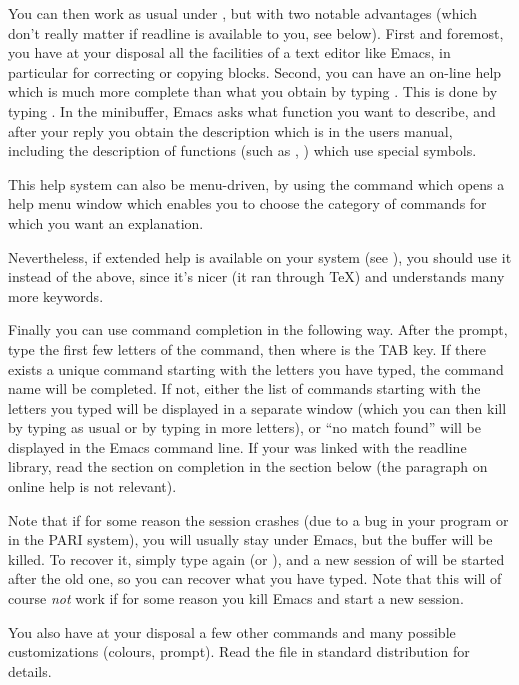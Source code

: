 \smallskip
  You can then work as usual under , but with two notable advantages (which
don't really matter if readline is available to you, see below). First and
foremost, you have at your disposal all the facilities of a text editor like
Emacs, in particular for correcting or copying blocks. Second, you can have
an on-line help which is much more complete than what you obtain by typing
. This is done by typing . In the minibuffer, Emacs asks
what function you want to describe, and after your reply you obtain the
description which is in the users manual, including the description of
functions (such as \kbd{\bs}, \kbd{\%}) which use special symbols.

  This help system can also be menu-driven, by using the command
 which opens a help menu window which enables you to choose
the category of commands for which you want an explanation.

  Nevertheless, if extended help is available on your system (see
), you should use it instead of the above, since it's
nicer (it ran through \TeX) and understands many more keywords.

  Finally you can use command completion in the following way. After the
prompt, type the first few letters of the command, then  where
 is the TAB key. If there exists a unique command starting with
the letters you have typed, the command name will be completed. If not,
either the list of commands starting with the letters you typed will be
displayed in a separate window (which you can then kill by typing as usual
 or by typing in more letters), or ``no match found'' will be
displayed in the Emacs command line. If your  was linked with the readline
library, read the section on completion in the section below (the paragraph
on online help is not relevant).

Note that if for some reason the session crashes (due to a bug in your
program or in the PARI system), you will usually stay under Emacs, but the
 buffer will be killed. To recover it, simply type again 
(or ), and a new session of  will be started after
the old one, so you can recover what you have typed. Note that this will of
course \emph{not} work if for some reason you kill Emacs and start a new
session.

\smallskip You also have at your disposal a few other commands and many
possible customizations (colours, prompt). Read the file
 in standard distribution for details.



